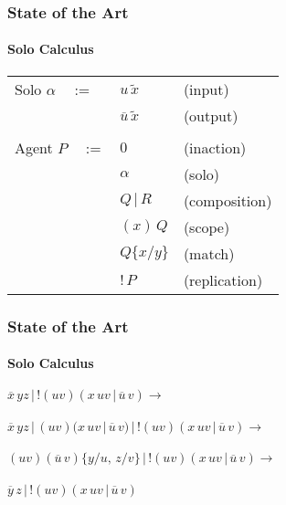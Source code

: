 \documentclass{beamer}
\begin{document}
    \begin{frame}
        \frametitle{State of the Art}
        \framesubtitle{Solo Calculus}
        \begin{center}
            \begin{tabular}{ l l l }
                Solo $\alpha \quad :=$  & $u \, \tilde{x}$              & (input) \\
                                        & $\overline{u} \, \tilde{x}$   & (output) \\ \\
                Agent $P \quad :=$      & $0$                           & (inaction) \\
                                        & $\alpha$                      & (solo) \\
                                        & $Q \, | \, R$                 & (composition) \\
                                        & $(x) \, Q$                    & (scope) \\
                                        & $Q\{x/y\}$                    & (match) \\
                                        & $!\,P$                        & (replication)
            \end{tabular}
        \end{center}
    \end{frame}

    \begin{frame}
        \frametitle{State of the Art}
        \framesubtitle{Solo Calculus}
        \begin{center}
                $\overline{x} \, y z \, | \, !(uv)(x \, u v \, | \, \overline{u} \, v) \rightarrow$ \\~\\
                $\overline{x} \, y z \, | \, (uv)(x \, uv \, | \, \overline{u} \, v) \, | \, !(uv)(x \, uv \, | \, \overline{u} \, v) \rightarrow$ \\~\\
                $(uv)(\overline{u} \, v)\{y/u, \, z/v\} \, | \, !(uv)(x \, uv \, | \, \overline{u} \, v) \rightarrow$ \\~\\
                $\overline{y} \, z \, | \, !(uv)(x \, u v \, | \, \overline{u} \, v)$
        \end{center}
    \end{frame}
   
\end{document}
